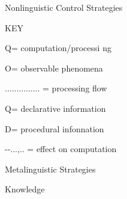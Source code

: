 \begin{center}
\begin{minipage}{0.8193in}
\begin{styleFramecontents}
Nonlinguistic Control Strategies
\end{styleFramecontents}


\end{minipage}
\end{center}
\begin{center}
\begin{minipage}{0.1839in}
\begin{styleFramecontents}
KEY
\end{styleFramecontents}


\end{minipage}
\end{center}
\begin{center}
\begin{minipage}{1.3945in}
\begin{styleFramecontents}
Q= computation/processi ng
\end{styleFramecontents}


\begin{styleFramecontents}
O= observable phenomena
\end{styleFramecontents}


\begin{styleFramecontents}
............... = processing flow
\end{styleFramecontents}


\end{minipage}
\end{center}
\begin{center}
\begin{minipage}{1.3272in}
\begin{styleFramecontents}
Q= declarative information
\end{styleFramecontents}


\begin{styleFramecontents}
D= procedural infonnation
\end{styleFramecontents}


\begin{styleFramecontents}
{}-{}-...,.. = effect on computation
\end{styleFramecontents}


\end{minipage}
\end{center}
\begin{center}
\begin{minipage}{0.8236in}
\begin{styleFramecontents}
Metalinguistic Strategies
\end{styleFramecontents}


\end{minipage}
\end{center}
\begin{styleStandard}
Knowledge
\end{styleStandard}


